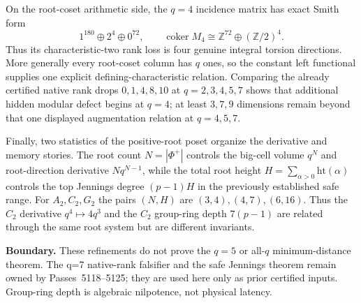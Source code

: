 On the root-coset arithmetic side, the $q=4$ incidence matrix has exact Smith form
\[
1^{180}\oplus2^4\oplus0^{72},
\qquad
\operatorname{coker}M_4\cong\mathbb Z^{72}\oplus(\mathbb Z/2)^4.
\]
Thus its characteristic-two rank loss is four genuine integral torsion directions.  More generally every root-coset column has $q$ ones, so the constant left functional supplies one explicit defining-characteristic relation.  Comparing the already certified native rank drops $0,1,4,8,10$ at $q=2,3,4,5,7$ shows that additional hidden modular defect begins at $q=4$; at least $3,7,9$ dimensions remain beyond that one displayed augmentation relation at $q=4,5,7$.

Finally, two statistics of the positive-root poset organize the derivative and memory stories.  The root count $N=|\Phi^+|$ controls the big-cell volume $q^N$ and root-direction derivative $Nq^{N-1}$, while the total root height $H=\sum_{\alpha>0}\mathrm{ht}(\alpha)$ controls the top Jennings degree $(p-1)H$ in the previously established safe range.  For $A_2,C_2,G_2$ the pairs $(N,H)$ are $(3,4),(4,7),(6,16)$.  Thus the $C_2$ derivative $q^4\mapsto4q^3$ and the $C_2$ group-ring depth $7(p-1)$ are related through the same root system but are different invariants.

\textbf{Boundary.}  These refinements do not prove the $q=5$ or all-$q$ minimum-distance theorem.  The q=7 native-rank falsifier and the safe Jennings theorem remain owned by Passes~5118--5125; they are used here only as prior certified inputs.  Group-ring depth is algebraic nilpotence, not physical latency.
\fi

